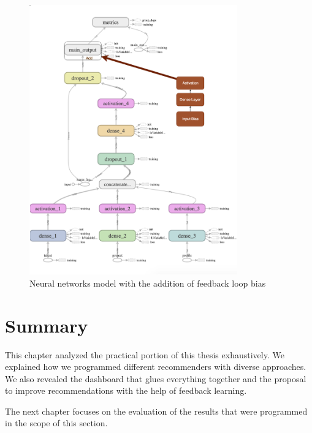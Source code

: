  \begin{figure}[htp]
	\centering
	\includegraphics[width=0.8\textwidth]{figures/TensorBoardFeedback.png}
	\caption{Neural networks model with the addition of feedback loop bias}
	\label{fig:tensorboard-feedback}
\end{figure}



\section{Summary}

This chapter analyzed the practical portion of this thesis exhaustively. We explained how we programmed different recommenders with diverse approaches. We also revealed the dashboard that glues everything together and the proposal to improve recommendations with the help of feedback learning. 

The next chapter focuses on the evaluation of the results that were programmed in the scope of this section.

